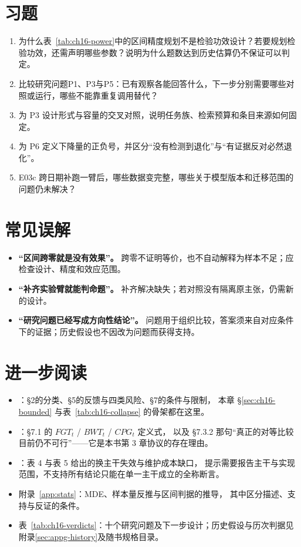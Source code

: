 \section*{习题}
\begin{enumerate}[label=16-\arabic*.,ref=16-\arabic*]
 \item\label{ex:ch16-1} 为什么表~\ref{tab:ch16-power}中的区间精度规划不是检验功效设计？若要规划检验功效，还需声明哪些参数？说明为什么题数达到历史估算仍不保证可以判定。
 \item\label{ex:ch16-2} 比较研究问题P1、P3与P5：已有观察各能回答什么，下一步分别需要哪些对照或运行，哪些不能靠重复调用替代？
 \item\label{ex:ch16-3} 为 P3 设计形式与容量的交叉对照，说明任务族、检索预算和条目来源如何固定。
 \item\label{ex:ch16-4} 为 P6 定义下降量的正负号，并区分“没有检测到退化”与“有证据反对必然退化”。
 \item\label{ex:ch16-5} E03c 跨日期补跑一臂后，哪些数据变完整，哪些关于模型版本和迁移范围的问题仍未解决？
\end{enumerate}

\section*{常见误解}
\begin{itemize}
 \item \textbf{“区间跨零就是没有效果”。} 跨零不证明等价，也不自动解释为样本不足；应检查设计、精度和效应范围。
 \item \textbf{“补齐实验臂就能判命题”。} 补齐解决缺失；若对照没有隔离原主张，仍需新的设计。
 \item \textbf{“研究问题已经写成方向性结论”。} 问题用于组织比较，答案须来自对应条件下的证据；历史假设也不因改为问题而获得支持。
\end{itemize}

\section*{进一步阅读}
\begin{itemize}
  \item \cite{rsi-survey-2607}：§2的分类、§5的反馈与四类风险、§7的条件与限制，
        本章 \S\ref{sec:ch16-bounded} 与表~\ref{tab:ch16-collapse} 的骨架都在这里。
  \item \cite{self-evolving-survey-2507}：§7.1 的 $FGT_t$ / $BWT_t$ / $CPG_t$ 定义式，
        以及 §7.3.2 那句“真正的对等比较目前仍不可行”——它是本书第 3 章协议的存在理由。
  \item \cite{anatomy-memory-2602}：表 4 与表 5 给出的换主干失效与维护成本缺口，
        提示需要报告主干与实现范围，不支持所有结论只能在单一主干成立的全称断言。
  \item 附录~\ref{app:stats}：MDE、样本量反推与区间判据的推导，
        其中区分描述、支持与反证的条件。
  \item 表~\ref{tab:ch16-verdicts}：十个研究问题及下一步设计；历史假设与历次判据见附录\ref{sec:appg-history}及随书规格目录。
\end{itemize}
